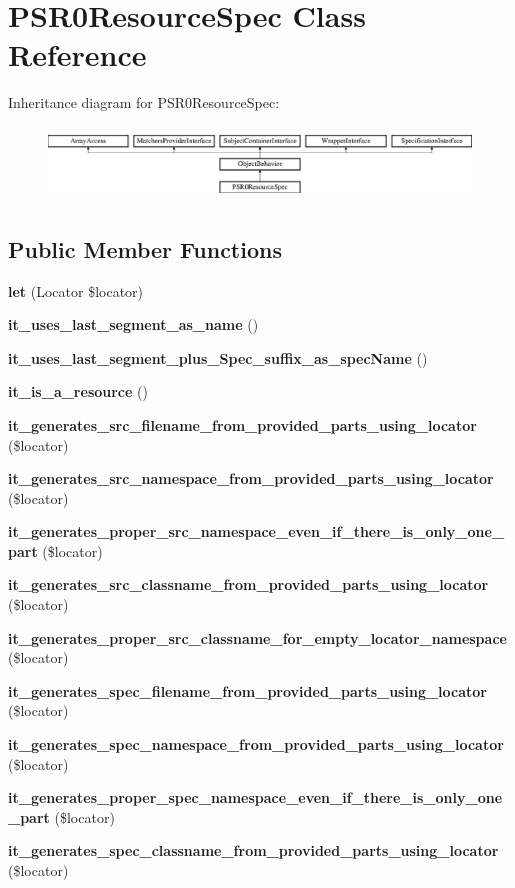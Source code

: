 \section{P\+S\+R0\+Resource\+Spec Class Reference}
\label{classspec_1_1_php_spec_1_1_locator_1_1_p_s_r0_1_1_p_s_r0_resource_spec}
Inheritance diagram for P\+S\+R0\+Resource\+Spec\+:\begin{figure}[H]
\begin{center}
\leavevmode
\includegraphics[height=1.953488cm]{classspec_1_1_php_spec_1_1_locator_1_1_p_s_r0_1_1_p_s_r0_resource_spec}
\end{center}
\end{figure}
\subsection*{Public Member Functions}
\begin{DoxyCompactItemize}
\item 
{\bf let} (Locator \$locator)
\item 
{\bf it\+\_\+uses\+\_\+last\+\_\+segment\+\_\+as\+\_\+name} ()
\item 
{\bf it\+\_\+uses\+\_\+last\+\_\+segment\+\_\+plus\+\_\+\+Spec\+\_\+suffix\+\_\+as\+\_\+spec\+Name} ()
\item 
{\bf it\+\_\+is\+\_\+a\+\_\+resource} ()
\item 
{\bf it\+\_\+generates\+\_\+src\+\_\+filename\+\_\+from\+\_\+provided\+\_\+parts\+\_\+using\+\_\+locator} (\$locator)
\item 
{\bf it\+\_\+generates\+\_\+src\+\_\+namespace\+\_\+from\+\_\+provided\+\_\+parts\+\_\+using\+\_\+locator} (\$locator)
\item 
{\bf it\+\_\+generates\+\_\+proper\+\_\+src\+\_\+namespace\+\_\+even\+\_\+if\+\_\+there\+\_\+is\+\_\+only\+\_\+one\+\_\+part} (\$locator)
\item 
{\bf it\+\_\+generates\+\_\+src\+\_\+classname\+\_\+from\+\_\+provided\+\_\+parts\+\_\+using\+\_\+locator} (\$locator)
\item 
{\bf it\+\_\+generates\+\_\+proper\+\_\+src\+\_\+classname\+\_\+for\+\_\+empty\+\_\+locator\+\_\+namespace} (\$locator)
\item 
{\bf it\+\_\+generates\+\_\+spec\+\_\+filename\+\_\+from\+\_\+provided\+\_\+parts\+\_\+using\+\_\+locator} (\$locator)
\item 
{\bf it\+\_\+generates\+\_\+spec\+\_\+namespace\+\_\+from\+\_\+provided\+\_\+parts\+\_\+using\+\_\+locator} (\$locator)
\item 
{\bf it\+\_\+generates\+\_\+proper\+\_\+spec\+\_\+namespace\+\_\+even\+\_\+if\+\_\+there\+\_\+is\+\_\+only\+\_\+one\+\_\+part} (\$locator)
\item 
{\bf it\+\_\+generates\+\_\+spec\+\_\+classname\+\_\+from\+\_\+provided\+\_\+parts\+\_\+using\+\_\+locator} (\$locator)
\end{DoxyCompactItemize}
